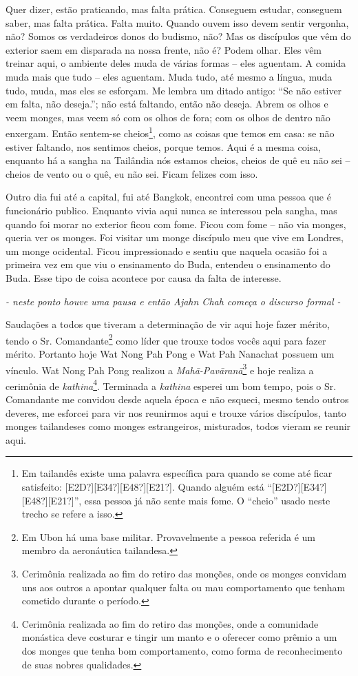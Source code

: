 Quer dizer, estão praticando, mas falta prática. Conseguem estudar,
conseguem saber, mas falta prática. Falta muito. Quando ouvem isso
devem sentir vergonha, não? Somos os verdadeiros donos do budismo, não?
Mas os discípulos que vêm do exterior saem em disparada na nossa
frente, não é? Podem olhar. Eles vêm treinar aqui, o ambiente deles
muda de várias formas – eles aguentam. A comida muda
mais que tudo – eles aguentam. Muda tudo, até mesmo
a língua, muda tudo, muda, mas eles se esforçam. Me lembra um ditado
antigo: “Se não estiver em falta, não deseja.”; não está faltando,
então não deseja. Abrem os olhos e veem monges, mas veem só com os
olhos de fora; com os olhos de dentro não enxergam. Então sentem-se
cheios\footnote{Em tailandês existe uma palavra específica para quando
se come até ficar satisfeito: [E2D?][E34?][E48?][E21?]. Quando alguém
está “[E2D?][E34?][E48?][E21?]”, essa pessoa já não sente mais fome. O
“cheio” usado neste trecho se refere a isso.}, como as coisas que temos
em casa: se não estiver faltando, nos sentimos cheios, porque temos.
Aqui é a mesma coisa, enquanto há a sangha na Tailândia nós estamos
cheios, cheios de quê eu não sei – cheios de vento
ou o quê, eu não sei. Ficam felizes com isso. 

Outro dia fui até a capital, fui até Bangkok, encontrei com uma
pessoa que é funcionário publico. Enquanto vivia aqui nunca se
interessou pela sangha, mas quando foi morar no exterior ficou com
fome. Ficou com fome – não via monges, queria ver os
monges. Foi visitar um monge discípulo meu que vive em Londres, um
monge ocidental. Ficou impressionado e sentiu que naquela ocasião foi a
primeira vez em que viu o ensinamento do Buda, entendeu o ensinamento
do Buda. Esse tipo de coisa acontece por causa da falta de interesse. 

{\itshape
- neste ponto houve uma pausa e então Ajahn Chah começa o discurso
formal -}

Saudações a todos que tiveram a determinação de vir aqui hoje fazer
mérito, tendo o Sr. Comandante\footnote{Em Ubon há uma base militar.
Provavelmente a pessoa referida é um membro da aeronáutica tailandesa.
} como líder que trouxe todos vocês aqui para fazer mérito. Portanto
hoje Wat Nong Pah Pong e Wat Pah Nanachat possuem um vínculo. Wat Nong
Pah Pong realizou a \textit{Mah\=a-Pav\=aran\=a}\footnote{Cerimônia
realizada ao fim do retiro das monções, onde os monges convidam uns aos
outros a apontar qualquer falta ou mau comportamento que tenham
cometido durante o período.} e hoje realiza a cerimônia de
\textit{kathina}\footnote{Cerimônia realizada ao fim do retiro das
monções, onde a comunidade monástica deve costurar e tingir um manto e
o oferecer como prêmio a um dos monges que tenha bom comportamento,
como forma de reconhecimento de suas nobres qualidades.}. Terminada a
\textit{kathina} esperei um bom tempo, pois o Sr. Comandante me
convidou desde aquela época e não esqueci, mesmo tendo outros deveres,
me esforcei para vir nos reunirmos aqui e trouxe vários discípulos,
tanto monges tailandeses como monges estrangeiros, misturados, todos
vieram se reunir aqui. 


